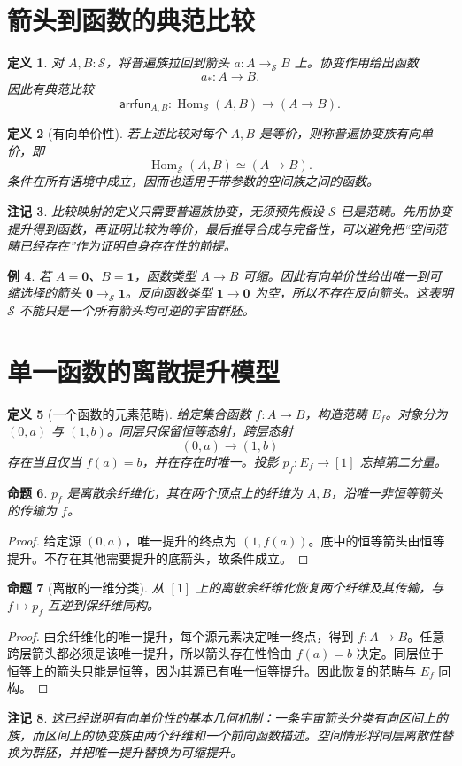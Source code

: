 \documentclass[12pt,oneside,openany,fontset=none]{ctexbook}
\theoremstyle{cn}
\newtheorem{definition}{定义}[chapter]
\newtheorem{example}[definition]{例}
\newtheorem{proposition}[definition]{命题}
\newtheorem{remark}[definition]{注记}
\numberwithin{equation}{chapter}
\newcommand{\Sp}{\mathcal S}
\newcommand{\Hom}{\operatorname{Hom}}
\newcommand{\one}{\mathbf 1}
\newcommand{\zero}{\mathbf 0}
\begin{document}
\section{箭头到函数的典范比较}
\begin{definition}
对 $A,B:\Sp$，将普遍族拉回到箭头 $a:A\to_\Sp B$ 上。协变作用给出函数
\[
a_*:A\to B.
\]
因此有典范比较
\[
\mathsf{arrfun}_{A,B}:\Hom_\Sp(A,B)\to(A\to B).
\]
\end{definition}
\begin{definition}[有向单价性]\label{def:directed-univalence}
若上述比较对每个 $A,B$ 是等价，则称普遍协变族有向单价，即
\[
\Hom_\Sp(A,B)\simeq(A\to B).
\]
条件在所有语境中成立，因而也适用于带参数的空间族之间的函数。
\end{definition}
\begin{remark}
比较映射的定义只需要普遍族协变，无须预先假设 $\Sp$ 已是范畴。先用协变提升得到函数，再证明比较为等价，最后推导合成与完备性，可以避免把“空间范畴已经存在”作为证明自身存在性的前提。
\end{remark}
\begin{example}
若 $A=\zero$、$B=\one$，函数类型 $A\to B$ 可缩。因此有向单价性给出唯一到可缩选择的箭头 $\zero\to_\Sp\one$。反向函数类型 $\one\to\zero$ 为空，所以不存在反向箭头。这表明 $\Sp$ 不能只是一个所有箭头均可逆的宇宙群胚。
\end{example}

\section{单一函数的离散提升模型}
\begin{definition}[一个函数的元素范畴]
给定集合函数 $f:A\to B$，构造范畴 $E_f$。对象分为 $(0,a)$ 与 $(1,b)$。同层只保留恒等态射，跨层态射
\[
(0,a)\longrightarrow(1,b)
\]
存在当且仅当 $f(a)=b$，并在存在时唯一。投影 $p_f:E_f\to[1]$ 忘掉第二分量。
\end{definition}
\begin{proposition}
$p_f$ 是离散余纤维化，其在两个顶点上的纤维为 $A,B$，沿唯一非恒等箭头的传输为 $f$。
\end{proposition}
\begin{proof}
给定源 $(0,a)$，唯一提升的终点为 $(1,f(a))$。底中的恒等箭头由恒等提升。不存在其他需要提升的底箭头，故条件成立。
\end{proof}
\begin{proposition}[离散的一维分类]
从 $[1]$ 上的离散余纤维化恢复两个纤维及其传输，与 $f\mapsto p_f$ 互逆到保纤维同构。
\end{proposition}
\begin{proof}
由余纤维化的唯一提升，每个源元素决定唯一终点，得到 $f:A\to B$。任意跨层箭头都必须是该唯一提升，所以箭头存在性恰由 $f(a)=b$ 决定。同层位于恒等上的箭头只能是恒等，因为其源已有唯一恒等提升。因此恢复的范畴与 $E_f$ 同构。
\end{proof}
\begin{remark}
这已经说明有向单价性的基本几何机制：一条宇宙箭头分类有向区间上的族，而区间上的协变族由两个纤维和一个前向函数描述。空间情形将同层离散性替换为群胚，并把唯一提升替换为可缩提升。
\end{remark}
\end{document}
